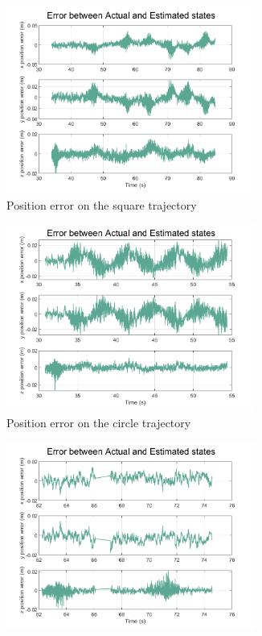 \documentclass[letterpaper, paper,11pt]{AAS}	%
\begin{document}
\begin{figure}[htb]
\centering
\begin{subfigure}{.5\textwidth}
	\centering
	\includegraphics[width=0.9\textwidth]{../square1_err}
	\caption{Position error on the square trajectory}
	\label{fig:SquareErr1}
\end{subfigure}%
\begin{subfigure}{.5\textwidth}
	\centering
	\includegraphics[width=0.9\textwidth]{../circle1_err}
	\caption{Position error on the circle trajectory}
	\label{fig:SquareErr2}
\end{subfigure}
\begin{subfigure}{.5\textwidth}
	\centering
	\includegraphics[width=0.9\textwidth]{../hover1_err}

\end{subfigure}
\end{figure}
\end{document}
